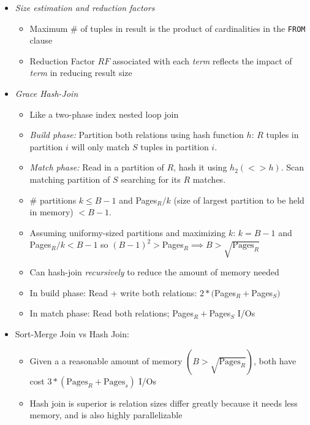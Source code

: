 \documentclass[landscape,8pt]{extarticle}
\newcommand{\code}{\lstinline}
\begin{document}
\begin{multicols}{4}
\begin{itemize}
\begin{itemize}
\begin{itemize}
            \end{itemize}
            \item \emph{Size estimation and reduction factors}
            \begin{itemize}
                \item Maximum \# of tuples in result is the product of cardinalities in the \code{FROM} clause
                \item Reduction Factor $RF$ associated with each \emph{term} reflects the impact of \emph{term} in reducing result size
            \end{itemize}
            \item \emph{Grace Hash-Join}
            \begin{itemize}
                \item Like a two-phase index nested loop join
                \item \emph{Build phase:} Partition both relations using hash function $h$: $R$ tuples in partition $i$ will only match $S$ tuples in partition $i$.
                \item \emph{Match phase:} Read in a partition of $R$, hash it using $h_2 (<>h)$. Scan matching partition of $S$ searching for its $R$ matches.
                \item \# partitions $k \leq B-1$ and Pages$_R /k$ (size of largest partition to be held in memory) $< B-1$.
                \item Assuming uniformy-sized partitions and maximizing $k$: $k = B-1$ and Pages$_R /k < B-1$ so $(B-1)^2 > $Pages$_R \implies B > \sqrt{\text{Pages}_R}$
                \item Can hash-join \emph{recursively} to reduce the amount of memory needed
                \item In build phase: Read + write both relations: $2*($Pages$_R + $Pages$_S)$
                \item In match phase: Read both relations; Pages$_R + $Pages$_S$ I/Os
            \end{itemize}
            \item Sort-Merge Join vs Hash Join:
            \begin{itemize}
                \item Given a a reasonable amount of memory $(B > \sqrt{\text{Pages}_R})$, both have cost $3*(\text{Pages}_R + \text{Pages}_s)$ I/Os
                \item Hash join is superior is relation sizes differ greatly because it needs less memory, and is also highly parallelizable

\end{itemize}
\end{itemize}
\end{itemize}
\end{multicols}
\end{document}
